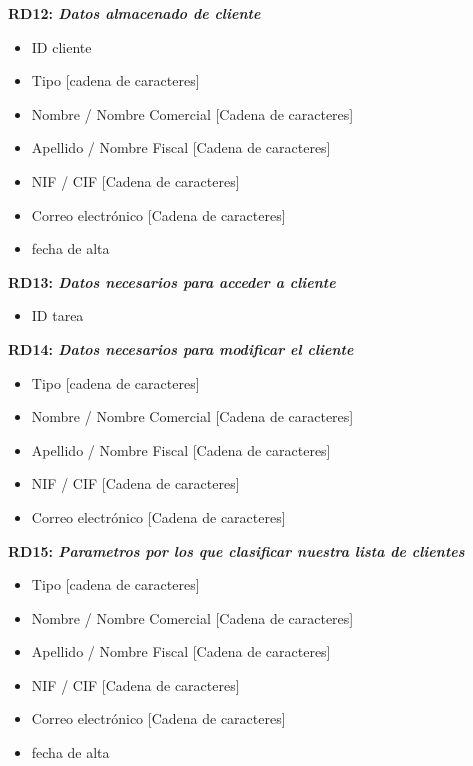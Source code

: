 \documentclass[paper=a4, fontsize=11pt, spanish]{scrartcl}
\begin{document}
\setlength{\parindent}{0em}
\textbf{RD12: \textit{Datos almacenado de cliente}}
\setlength{\parindent}{2em}
\begin{itemize}
\item ID cliente
\item Tipo [cadena de caracteres]
\item Nombre / Nombre Comercial [Cadena de caracteres]
\item Apellido / Nombre Fiscal [Cadena de caracteres]
\item NIF / CIF [Cadena de caracteres]
\item Correo electrónico [Cadena de caracteres]
\item fecha de alta
\end{itemize}

\setlength{\parindent}{0em}
\textbf{RD13: \textit{Datos necesarios para acceder a cliente}}
\setlength{\parindent}{2em}
\begin{itemize}
\item ID tarea
\end{itemize}

\setlength{\parindent}{0em}
\textbf{RD14: \textit{Datos necesarios para modificar el cliente}}
\setlength{\parindent}{2em}
\begin{itemize}
\item Tipo [cadena de caracteres]
\item Nombre / Nombre Comercial [Cadena de caracteres]
\item Apellido / Nombre Fiscal [Cadena de caracteres]
\item NIF / CIF [Cadena de caracteres]
\item Correo electrónico [Cadena de caracteres]
\end{itemize}

\setlength{\parindent}{0em}
\textbf{RD15: \textit{Parametros por los que clasificar nuestra lista de clientes}}
\setlength{\parindent}{2em}
\begin{itemize}
\item Tipo [cadena de caracteres]
\item Nombre / Nombre Comercial [Cadena de caracteres]
\item Apellido / Nombre Fiscal [Cadena de caracteres]
\item NIF / CIF [Cadena de caracteres]
\item Correo electrónico [Cadena de caracteres]
\item fecha de alta
\end{itemize}
\end{document}

